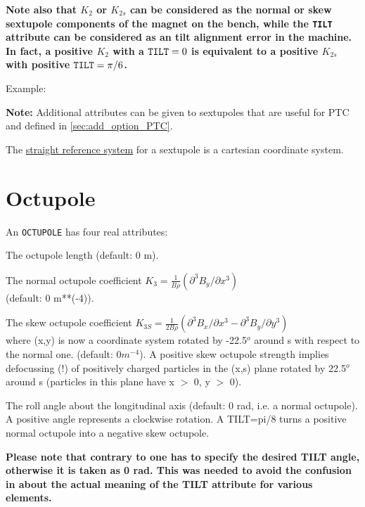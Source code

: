 \textbf{Note also that $K_2$ or $K_{2s}$ can be considered as the normal
  or skew sextupole components of the magnet on the bench, while the
  {\tt TILT} attribute can be considered as an tilt alignment error in the
  machine. In fact, a positive $K_2$ with a ${\tt TILT} = 0$ is equivalent to a
  positive $K_{2s}$ with positive ${\tt TILT} = \pi/6$.} 

Example: 

{\bf Note:} Additional attributes can be given to sextupoles that
are useful for PTC and defined in \ref{sec:add_option_PTC}.

The \href{local_system.html#straight}{straight reference system} for a
sextupole is a cartesian coordinate system.   


\section{Octupole}
\label{sec:octupole}


An {\tt OCTUPOLE} has four real attributes: 
\begin{madlist}
    The octupole length (default: 0 m). 

    The normal octupole coefficient 
     $K_3 = \frac{1}{B \rho} (\partial^3B_y / \partial x^3)$ \\ 
     (default: 0 m**(-4)). 

    The skew octupole coefficient 
     $K_{3S} = \frac{1}{2 B\rho} (\partial^3B_x/\partial x^3 -
   \partial^3B_y/\partial y^3)$ \\
     where (x,y) is now a coordinate system rotated by -22.5$^o$ around
     s with respect to the normal one. (default: $0 m^{-4}$). A positive
     skew octupole strength implies defocussing (!) of positively
     charged particles in the (x,s) plane rotated by 22.5$^o$ around s
     (particles in this plane have x $>$ 0, y $>$ 0).  

    The roll angle about the longitudinal axis (default: 0
     rad, i.e. a normal octupole). A positive angle represents a
     clockwise rotation. A TILT=pi/8 turns a positive normal octupole
     into a negative skew octupole.  

     \textbf{Please note that contrary to \madeight one has to specify the
       desired TILT angle, otherwise it is taken as 0 rad. This was
       needed to avoid the confusion in \madeight about the actual meaning of
       the TILT attribute for various elements. }

\end{madlist}

